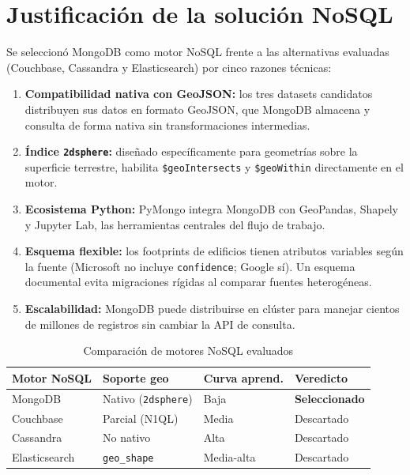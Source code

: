 \documentclass[12pt, a4paper]{report}
\begin{document}
\section{Justificación de la solución NoSQL}

Se seleccionó MongoDB como motor NoSQL frente a las alternativas evaluadas
(Couchbase, Cassandra y Elasticsearch) por cinco razones técnicas:

\begin{enumerate}[label=\arabic*.]
  \item \textbf{Compatibilidad nativa con GeoJSON:} los tres datasets candidatos
        distribuyen sus datos en formato GeoJSON, que MongoDB almacena y consulta
        de forma nativa sin transformaciones intermedias.
  \item \textbf{Índice \texttt{2dsphere}:} diseñado específicamente para geometrías
        sobre la superficie terrestre, habilita \texttt{\$geoIntersects} y
        \texttt{\$geoWithin} directamente en el motor.
  \item \textbf{Ecosistema Python:} PyMongo integra MongoDB con GeoPandas, Shapely
        y Jupyter Lab, las herramientas centrales del flujo de trabajo.
  \item \textbf{Esquema flexible:} los footprints de edificios tienen atributos
        variables según la fuente (Microsoft no incluye \texttt{confidence};
        Google sí). Un esquema documental evita migraciones rígidas al comparar
        fuentes heterogéneas.
  \item \textbf{Escalabilidad:} MongoDB puede distribuirse en clúster para manejar
        cientos de millones de registros sin cambiar la API de consulta.
\end{enumerate}

\begin{table}[H]
  \centering
  \caption{Comparación de motores NoSQL evaluados}
  \label{tab:motores_nosql}
  \begin{tabularx}{\textwidth}{llll}
    \toprule
    \textbf{Motor NoSQL} & \textbf{Soporte geo} & \textbf{Curva aprend.} & \textbf{Veredicto} \\
    \midrule
    MongoDB       & Nativo (\texttt{2dsphere})  & Baja       & \textbf{Seleccionado} \\
    Couchbase     & Parcial (N1QL)               & Media      & Descartado \\
    Cassandra     & No nativo                   & Alta       & Descartado \\
    Elasticsearch & \texttt{geo\_shape}          & Media-alta & Descartado \\
    \bottomrule
  \end{tabularx}
\end{table}
\end{document}
